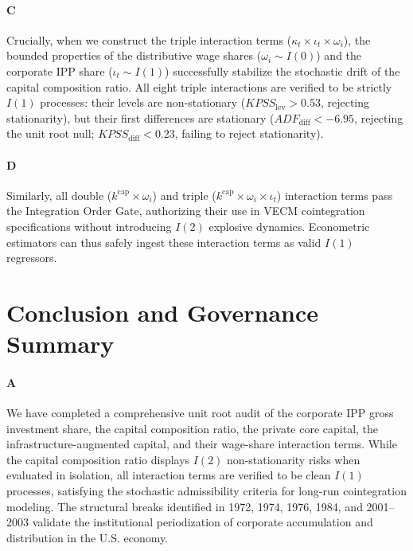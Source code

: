 \documentclass[11pt,a4paper]{article}
\begin{document}
\paragraph{C}
Crucially, when we construct the triple interaction terms ($\kappa_t \times \iota_t \times \omega_i$), the bounded properties of the distributive wage shares ($\omega_i \sim I(0)$) and the corporate IPP share ($\iota_t \sim I(1)$) successfully stabilize the stochastic drift of the capital composition ratio. All eight triple interactions are verified to be strictly $I(1)$ processes: their levels are non-stationary ($KPSS_{\text{lev}} > 0.53$, rejecting stationarity), but their first differences are stationary ($ADF_{\text{diff}} < -6.95$, rejecting the unit root null; $KPSS_{\text{diff}} < 0.23$, failing to reject stationarity).

\paragraph{D}
Similarly, all double ($k^{\text{cap}} \times \omega_i$) and triple ($k^{\text{cap}} \times \omega_i \times \iota_t$) interaction terms pass the Integration Order Gate, authorizing their use in VECM cointegration specifications without introducing $I(2)$ explosive dynamics. Econometric estimators can thus safely ingest these interaction terms as valid $I(1)$ regressors.

\FloatBarrier
\section{Conclusion and Governance Summary}

\paragraph{A}
We have completed a comprehensive unit root audit of the corporate IPP gross investment share, the capital composition ratio, the private core capital, the infrastructure-augmented capital, and their wage-share interaction terms. While the capital composition ratio displays $I(2)$ non-stationarity risks when evaluated in isolation, all interaction terms are verified to be clean $I(1)$ processes, satisfying the stochastic admissibility criteria for long-run cointegration modeling. The structural breaks identified in 1972, 1974, 1976, 1984, and 2001--2003 validate the institutional periodization of corporate accumulation and distribution in the U.S. economy.
\end{document}
